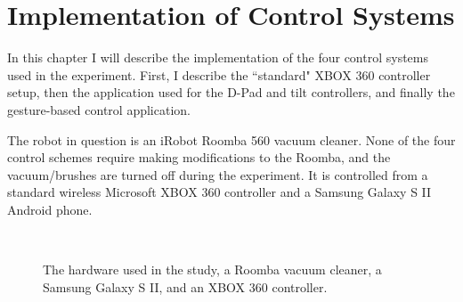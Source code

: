 \documentclass[12pt, letterpaper]{report}
\begin{document}
\chapter{Implementation of Control Systems}
In this chapter I will describe the implementation of the four control systems used in the experiment. First, I describe the ``standard" XBOX 360 controller setup, then the application used for the D-Pad and tilt controllers, and finally the gesture-based control application.

The robot in question is an iRobot Roomba 560 vacuum  cleaner. None of the four control schemes require making modifications to the Roomba, and the vacuum/brushes are turned off during the experiment. It is controlled from a standard wireless Microsoft XBOX 360 controller and a Samsung Galaxy S II Android phone.

\begin{figure}[h!]
	\centering
	~
	~
	\caption{The hardware used in the study, a Roomba vacuum cleaner, a Samsung Galaxy S II, and an XBOX 360 controller.}
	\label{hardware}
\end{figure}
\end{document}
